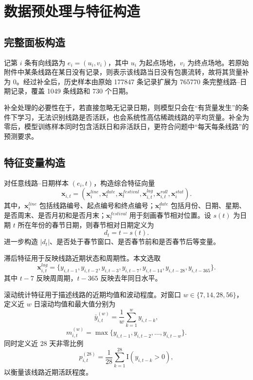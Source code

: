 \documentclass[UTF8,zihao=-4,a4paper,fontset=fandol]{ctexart}
\newcommand{\I}{\mathrm{I}}
\begin{document}
\section{数据预处理与特征构造}

\subsection{完整面板构造}

记第 $i$ 条有向线路为 $e_i=(u_i,v_i)$，其中 $u_i$ 为起点场地，$v_i$ 为终点场地。若原始附件中某条线路在某日没有记录，则表示该线路当日没有包裹流转，故将其货量补为 0。经过补全后，历史样本由原始 177847 条记录扩展为 765770 条完整线路--日期记录，覆盖 1049 条线路和 730 个日期。

补全处理的必要性在于，若直接忽略无记录日期，则模型只会在“有货量发生”的条件下学习，无法识别线路是否活跃，也会系统性高估稀疏线路的平均货量。补全为零后，模型训练样本同时包含活跃日和非活跃日，更符合问题中“每天每条线路”的预测要求。

\subsection{特征变量构造}

对任意线路--日期样本 $(e_i,t)$，构造综合特征向量
\begin{equation}
  \boldsymbol{x}_{i,t}=\left(\boldsymbol{x}^{line}_{i},
  \boldsymbol{x}^{date}_{t},
  \boldsymbol{x}^{festival}_{t},
  \boldsymbol{x}^{lag}_{i,t},
  \boldsymbol{x}^{roll}_{i,t},
  \boldsymbol{x}^{stat}_{i}\right).
  \label{eq:feature-vector}
\end{equation}
其中，$\boldsymbol{x}^{line}_{i}$ 包括线路编号、起点编号和终点编号；$\boldsymbol{x}^{date}_{t}$ 包括月份、日期、星期、是否周末、是否月初和是否月末；$\boldsymbol{x}^{festival}_{t}$ 用于刻画春节相对位置。设 $s(t)$ 为日期 $t$ 所在年份的春节日期，则春节相对日期定义为
\begin{equation}
  d_t=t-s(t).
  \label{eq:spring-delta}
\end{equation}
进一步构造 $|d_t|$、是否处于春节窗口、是否春节前和是否春节后等变量。

滞后特征用于反映线路近期状态和周期性。本文选取
\begin{equation}
  \boldsymbol{x}^{lag}_{i,t}=
  \{y_{i,t-1},y_{i,t-2},y_{i,t-3},y_{i,t-7},y_{i,t-14},y_{i,t-28},y_{i,t-365}\}.
  \label{eq:lag}
\end{equation}
其中 $t-7$ 反映周周期，$t-365$ 反映去年同日水平。

滚动统计特征用于描述线路的近期均值和波动程度。对窗口 $w\in\{7,14,28,56\}$，定义近 $w$ 日滚动均值和最大值分别为
\begin{equation}
  \bar y_{i,t}^{(w)}=\frac{1}{w}\sum_{k=1}^{w}y_{i,t-k},
  \label{eq:rolling-mean}
\end{equation}
\begin{equation}
  m_{i,t}^{(w)}=\max\{y_{i,t-1},y_{i,t-2},\ldots,y_{i,t-w}\}.
  \label{eq:rolling-max}
\end{equation}
同时定义近 28 天非零比例
\begin{equation}
  p_{i,t}^{(28)}=\frac{1}{28}\sum_{k=1}^{28}\I(y_{i,t-k}>0),
  \label{eq:nonzero-ratio}
\end{equation}
以衡量该线路近期活跃程度。
\end{document}
